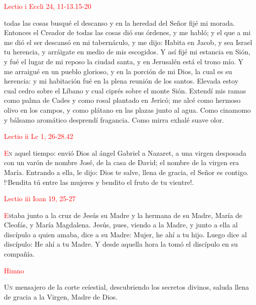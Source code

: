 \noindent\textcolor{red}{Lectio i \hfill Eccli 24, 11-13.15-20}

todas las cosas busqué el descanso y en la heredad del Señor fijé mi morada. Entonces el Creador de todas las cosas dió sus órdenes, y me habló; y el que a mi me dió el ser
descansó en mi tabernáculo, y me dijo: Habita en Jacob, y sea Israel tu herencia, y arráigate en medio de mis escogidos. Y así fijé mi estancia en Sión, y fué el lugar de mi reposo
la ciudad santa, y en Jerusalén está el trono mío. Y me arraigué en un pueblo glorioso, y en la porción de mi Dios, la cual es su herencia: y mi habitación fué en la plena reunión
de los santos. Elevada estoy cual cedro sobre el Líbano y cual ciprés sobre el monte Sión. Extendí mis ramas como palma de Cades y como rosal plantado en Jericó; me alcé como hermoso
olivo en los campos, y como plátano en las plazas junto al agua. Como cinamomo y bálsamo aromático desprendí fragancia. Como mirra exhalé suave olor.

\vspace{0.5em}

\noindent\textcolor{red}{Lectio ii \hfill Lc 1, 26-28.42}

\lettrine[lines=2]{\textcolor{red}{E}}n aquel tiempo: envió Dios al ángel Gabriel a Nazaret, a una virgen desposada con un varón de nombre José, de la casa de David; el nombre de la virgen era María. 
Entrando a ella, le dijo: Dios te salve, llena de gracia, el Señor es contigo. {!`}Bendita tú entre las mujeres y bendito el fruto de tu vientre!.

\vspace{0.5em}

\noindent\textcolor{red}{Lectio iii \hfill Ioan 19, 25-27}

\lettrine[lines=2]{\textcolor{red}{E}}staba junto a la cruz de Jesús su Madre y la hermana de su Madre, María de Cleofás, y María Magdalena. Jesús, pues, viendo a la Madre, y junto a ella
al discípulo a quien amaba, dice a su Madre: Mujer, he ahí a tu hijo. Luego dice al discípulo: He ahí a tu Madre. Y desde aquella hora la tomó el discípulo en su compañía.

\vspace{0.25em}

\begin{center}
      \textcolor{red}{Himno}
\end{center}

\vspace{-0.5em}

\lettrine[lines=2]{U}n mensajero de la corte ceíestial, descubriendo los se­cretos divinos, saluda llena de gracia a la Virgen, Madre de Dios.

